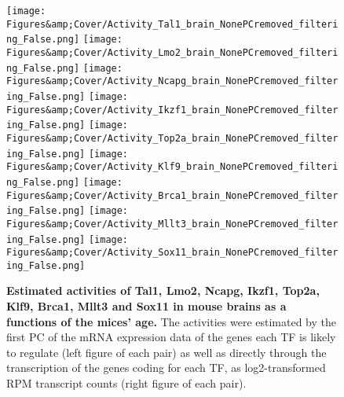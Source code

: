 \begin{figure}
    \centering
    \texttt{[image: Figures\&amp;Cover/Activity\_Tal1\_brain\_NonePCremoved\_filtering\_False.png]}
    \hspace{0.25cm}
    \vspace{0.25cm}
    \texttt{[image: Figures\&amp;Cover/Activity\_Lmo2\_brain\_NonePCremoved\_filtering\_False.png]}
    \vspace{0.25cm}
    \texttt{[image: Figures\&amp;Cover/Activity\_Ncapg\_brain\_NonePCremoved\_filtering\_False.png]}
    \hspace{0.25cm}
    \texttt{[image: Figures\&amp;Cover/Activity\_Ikzf1\_brain\_NonePCremoved\_filtering\_False.png]}
    \vspace{0.25cm}
    \texttt{[image: Figures\&amp;Cover/Activity\_Top2a\_brain\_NonePCremoved\_filtering\_False.png]}
    \hspace{0.25cm}
    \texttt{[image: Figures\&amp;Cover/Activity\_Klf9\_brain\_NonePCremoved\_filtering\_False.png]}
    \vspace{0.25cm}
    \texttt{[image: Figures\&amp;Cover/Activity\_Brca1\_brain\_NonePCremoved\_filtering\_False.png]}
    \hspace{0.25cm}
    \texttt{[image: Figures\&amp;Cover/Activity\_Mllt3\_brain\_NonePCremoved\_filtering\_False.png]}
    \vspace{0.25cm}
    \texttt{[image: Figures\&amp;Cover/Activity\_Sox11\_brain\_NonePCremoved\_filtering\_False.png]}
    \caption{\textbf{Estimated activities of Tal1, Lmo2, Ncapg, Ikzf1, Top2a, Klf9, Brca1, Mllt3 and Sox11 in mouse brains as a functions of the mices' age.} The activities were estimated by the first \ac{PC} of the mRNA expression data of the genes each \ac{TF} is likely to regulate (left figure of each pair) as well as directly through the transcription of the genes coding for each \ac{TF}, as log2-transformed \ac{RPM} transcript counts (right figure of each pair).}
    \label{fig:BrainEsts1}
\end{figure}    
    
